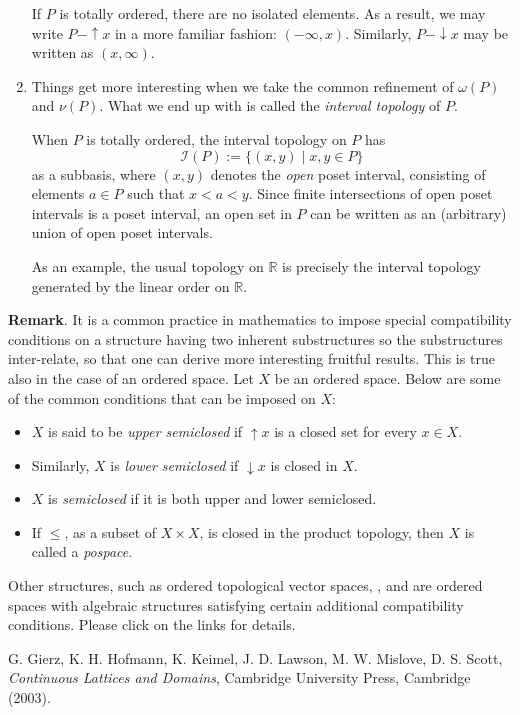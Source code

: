 \documentclass[12pt]{article}
\newcommand{\up}{\uparrow\!\!}
\newcommand{\down}{\downarrow\!\!}
\begin{document}
\begin{enumerate}
If $P$ is totally ordered, there are no isolated elements.  As a result, we may write $P-\up x$ in a more familiar fashion: $(-\infty,x)$.  Similarly, $P-\down x$ may be written as $(x,\infty)$.
\item
Things get more interesting when we take the common refinement of $\omega(P)$ and $\nu(P)$.  What we end up with is called the \emph{interval topology} of $P$.  

When $P$ is totally ordered, the interval topology on $P$ has $$\mathcal{I}(P):=\lbrace (x,y)\mid x,y\in P\rbrace$$
as a subbasis, where $(x,y)$ denotes the \emph{open} poset interval, consisting of elements $a\in P$ such that $x<a<y$.  Since finite intersections of open poset intervals is a poset interval, an open set in $P$ can be written as an (arbitrary) union of open poset intervals.

As an example, the usual topology on $\mathbb{R}$ is precisely the interval topology generated by the linear order on $\mathbb{R}$.
\end{enumerate}

\textbf{Remark}.  It is a common practice in mathematics to impose special compatibility conditions on a structure having two inherent substructures so the substructures inter-relate, so that one can derive more interesting fruitful results.  This is true also in the case of an ordered space.  Let $X$ be an ordered space.  Below are some of the common conditions that can be imposed on $X$:
\begin{itemize}
\item
$X$ is said to be \emph{upper semiclosed} if $\up x$ is a closed set for every $x\in X$.  
\item 
Similarly, $X$ is \emph{lower semiclosed} if $\down x$ is closed in $X$.  
\item
$X$ is \emph{semiclosed} if it is both upper and lower semiclosed.  
\item
If $\le$, as a subset of $X\times X$, is closed in the product topology, then $X$ is called a \emph{pospace}.
\end{itemize}
Other structures, such as ordered topological vector spaces, , and  are ordered spaces with algebraic structures satisfying certain additional compatibility conditions.  Please click on the links for details.


\begin{thebibliography}{8}
 G. Gierz, K. H. Hofmann, K. Keimel, J. D. Lawson, M. W. Mislove, D. S. Scott, {\em Continuous Lattices and Domains}, Cambridge University Press, Cambridge (2003).
\end{thebibliography}
\end{document}
